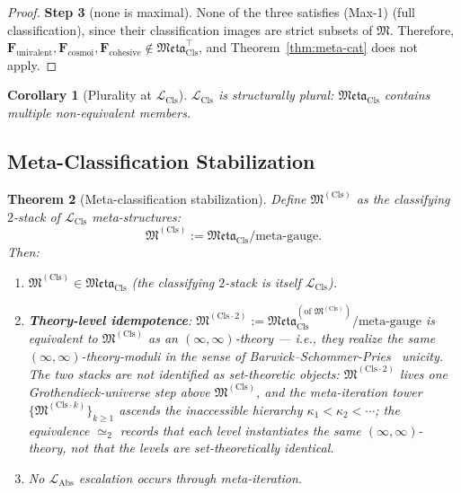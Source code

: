 \documentclass[11pt]{article}
\theoremstyle{plain}
\newtheorem{theorem}{Theorem}[section]
\newtheorem{corollary}[theorem]{Corollary}
\theoremstyle{definition}
\newcommand{\fM}{\mathfrak{M}}
\newcommand{\Meta}{\mathfrak{Meta}}
\newcommand{\LCls}{\mathcal{L}_{\mathrm{Cls}}}
\newcommand{\LAbs}{\mathcal{L}_{\mathrm{Abs}}}
\begin{document}
\begin{proof}
\textbf{Step 3} (none is maximal). None of the three satisfies (Max-1) (full classification), since their classification images are strict subsets of $\fM$. Therefore, $\mathbf{F}_{\mathrm{univalent}}, \mathbf{F}_{\mathrm{cosmoi}}, \mathbf{F}_{\mathrm{cohesive}} \notin \Meta_{\mathrm{Cls}}^{\top}$, and Theorem~\ref{thm:meta-cat} does not apply.
\end{proof}

\begin{corollary}[Plurality at $\LCls$]\label{cor:plurality}
$\LCls$ is structurally plural: $\Meta_{\mathrm{Cls}}$ contains multiple non-equivalent members.
\end{corollary}

\subsection{Meta-Classification Stabilization}

\begin{theorem}[Meta-classification stabilization]\label{thm:meta-stab}
Define $\fM^{(\mathrm{Cls})}$ as the classifying $2$-stack of $\LCls$ meta-structures:
\[ \fM^{(\mathrm{Cls})} := \Meta_{\mathrm{Cls}} / \text{meta-gauge}. \]
Then:
\begin{enumerate}
\item[\textbf{(a)}] $\fM^{(\mathrm{Cls})} \in \Meta_{\mathrm{Cls}}$ (the classifying $2$-stack is itself $\LCls$).
\item[\textbf{(b)}] \textbf{Theory-level idempotence}: $\fM^{(\mathrm{Cls}\cdot 2)} := \Meta_{\mathrm{Cls}}^{(\text{of }\fM^{(\mathrm{Cls})})} / \text{meta-gauge}$ is equivalent to $\fM^{(\mathrm{Cls})}$ \emph{as an $(\infty, \infty)$-theory} --- i.e., they realize the same $(\infty, \infty)$-theory-moduli in the sense of Barwick--Schommer-Pries~\cite{BarwickSchommerPries2021} unicity. The two stacks are \emph{not} identified as set-theoretic objects: $\fM^{(\mathrm{Cls}\cdot 2)}$ lives one Grothendieck-universe step above $\fM^{(\mathrm{Cls})}$, and the meta-iteration tower $\{\fM^{(\mathrm{Cls}\cdot k)}\}_{k \geq 1}$ ascends the inaccessible hierarchy $\kappa_1 < \kappa_2 < \cdots$; the equivalence $\simeq_2$ records that each level instantiates the same $(\infty, \infty)$-theory, not that the levels are set-theoretically identical.
\item[\textbf{(c)}] No $\LAbs$ escalation occurs through meta-iteration.
\end{enumerate}
\end{theorem}
\end{document}

